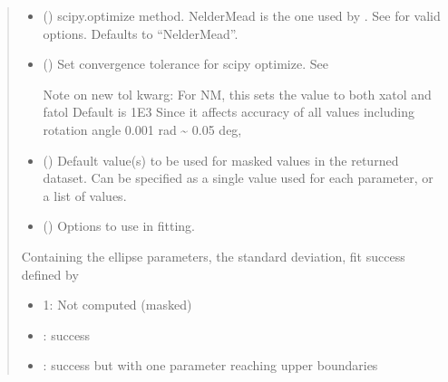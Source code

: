 \documentclass[letterpaper,10pt,english]{sphinxmanual}
\begin{document}
\begin{fulllineitems}
\begin{quote}
\begin{description}
\begin{itemize}
\item {}
\sphinxAtStartPar
{} () \textendash{} scipy.optimize method. Nelder\sphinxhyphen{}Mead is the one used by .
See 
for valid options. Defaults to “Nelder\sphinxhyphen{}Mead”.

\item {}
\sphinxAtStartPar
{} () \textendash{}
\sphinxAtStartPar
Set convergence tolerance for scipy optimize.
See 

\sphinxAtStartPar
Note on new tol kwarg:
For N\sphinxhyphen{}M, this sets the value to both xatol and fatol
Default is 1E\sphinxhyphen{}3
Since it affects accuracy of all values including rotation angle
0.001 rad \textasciitilde{} 0.05 deg,


\item {}
\sphinxAtStartPar
{} () \textendash{} Default value(s) to be used for masked values in the returned dataset.
Can be specified as a single value used for each parameter, or a list
of values.

\item {}
\sphinxAtStartPar
{} () \textendash{} Options to use in fitting.

\end{itemize}

\sphinxAtStartPar

\sphinxAtStartPar
Containing the ellipse parameters, the standard deviation, fit
success defined by
\begin{itemize}
\item {}
\sphinxAtStartPar
\sphinxhyphen{}1: Not computed (masked)

\item {}
: success

\item {}
: success but with one parameter reaching upper
boundaries


\end{itemize}
\end{description}
\end{quote}
\end{fulllineitems}
\end{document}
